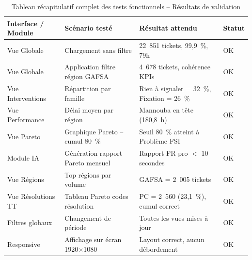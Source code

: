 \documentclass[11pt,a4paper]{report}
\begin{document}
\begin{table}[h!]
\centering
\caption{Tableau récapitulatif complet des tests fonctionnels -- Résultats de validation}
\begin{tabularx}{\textwidth}{L{3cm} L{4cm} L{4cm} C{1.5cm}}
\toprule
\textbf{Interface / Module} & \textbf{Scénario testé} & \textbf{Résultat attendu} & \textbf{Statut} \\
\midrule
Vue Globale        & Chargement sans filtre          & 22~851 tickets, 99,9~\%, 79h          & OK \\
Vue Globale        & Application filtre région GAFSA & 4~678 tickets, cohérence KPIs          & OK \\
Vue Interventions  & Répartition par famille         & Rien à signaler = 32~\%, Fixation = 26~\% & OK \\
Vue Performance    & Délai moyen par région          & Mannouba en tête (180,8~h)             & OK \\
Vue Pareto         & Graphique Pareto -- cumul 80~\% & Seuil 80~\% atteint à Problème FSI    & OK \\
Module IA          & Génération rapport Pareto mensuel & Rapport FR pro $<$ 10 secondes       & OK \\
Vue Régions        & Top régions par volume          & GAFSA = 2~005 tickets                 & OK \\
Vue Résolutions TT & Tableau Pareto codes résolution & PC = 2~560 (23,1~\%), cumul correct   & OK \\
Filtres globaux    & Changement de période           & Toutes les vues mises à jour           & OK \\
Responsive         & Affichage sur écran 1920×1080   & Layout correct, aucun débordement      & OK \\
\bottomrule
\end{tabularx}
\label{tab:tests}
\end{table}
\end{document}
